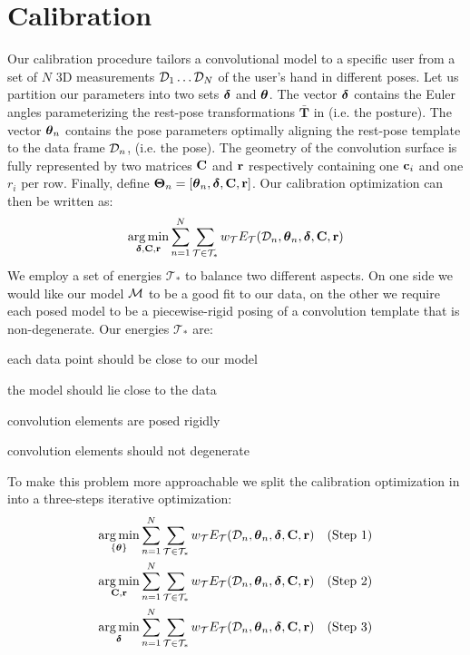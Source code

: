 \section{Calibration}
Our calibration procedure tailors a convolutional model to a specific user from a set of $N$ 3D measurements $\mathcal{D}_1 \dots \mathcal{D}_N$ of the user's hand in different poses. 
% 
% 
Let us partition our parameters into two sets $\boldsymbol{\delta}$ and $\boldsymbol{\theta}$. The vector $\boldsymbol{\delta}$ contains the Euler angles parameterizing the rest-pose transformations $\mathbf{\bar{T}}$ in  (i.e. the posture). The vector $\boldsymbol{\theta}_n$ contains the pose parameters optimally aligning the rest-pose template to the data frame $\mathcal{D}_n$, (i.e. the pose). The geometry of the convolution surface is fully represented by two matrices $\mathbf{C}$ and $\mathbf{r}$ respectively containing one $\mathbf{c}_i$ and one $r_i$ per row. Finally, define $\boldsymbol{\Theta}_n=[\boldsymbol{\theta}_n, \boldsymbol{\delta}, \mathbf{C}, \mathbf{r}]$. Our calibration optimization can then be written as:
% 
\begin{eqnarray}
\operatorname*{arg\,min}_{\boldsymbol{\delta}, \mathbf{C}, \mathbf{r}}
\sum_{n=1}^N 
\sum_{\mathcal{T} \in \mathcal{T}_*} 
w_\mathcal{T} E_\mathcal{T}(\mathcal{D}_n, \boldsymbol{\theta}_n, \boldsymbol{\delta}, \mathbf{C}, \mathbf{r})
\label{eq:calibration}
\end{eqnarray}
% 
We employ a set of energies $\mathcal{T}_*$ to balance two different aspects. On one side we would like our model $\mathcal{M}$ to be a good fit to our data, on the other we require each posed model to be a piecewise-rigid posing of a convolution template that is non-degenerate. Our energies $\mathcal{T}_*$ are:
% 
\begin{description}[labelsep=0em,labelwidth=.4in,labelindent=1cm]
\item[d2m] each data point should be close to our model
\item[m2d] the model should lie close to the data
\item[rigid] convolution elements are posed rigidly
\item[valid] convolution elements should not degenerate
\end{description}
% 
To make this problem more approachable we split the calibration optimization in  into a three-steps iterative optimization:
% 
\begin{eqnarray}
\operatorname*{arg\,min}_{{\{\boldsymbol{\theta}\}}} 
\sum_{n=1}^N 
\sum_{\mathcal{T} \in \mathcal{T}_*}
w_\mathcal{T} E_\mathcal{T}(\mathcal{D}_n, \boldsymbol{\theta}_n, \boldsymbol{\delta}, \mathbf{C}, \mathbf{r}) 
&& \text{(Step 1)}
\label{eq:step1}
\\
\operatorname*{arg\,min}_{\mathbf{C}, \mathbf{r}} 
\sum_{n=1}^N 
\sum_{\mathcal{T} \in \mathcal{T}_*}
w_\mathcal{T} E_\mathcal{T}(\mathcal{D}_n, \boldsymbol{\theta}_n, \boldsymbol{\delta}, \mathbf{C}, \mathbf{r})
&& \text{(Step 2)}
\label{eq:step2}
\\
\operatorname*{arg\,min}_{\boldsymbol{\delta}} 
\sum_{n=1}^N 
\sum_{\mathcal{T} \in \mathcal{T}_*}
w_\mathcal{T} E_\mathcal{T}(\mathcal{D}_n, \boldsymbol{\theta}_n, \boldsymbol{\delta}, \mathbf{C}, \mathbf{r}) 
&& \text{(Step 3)}
\label{eq:step3}
\end{eqnarray}
